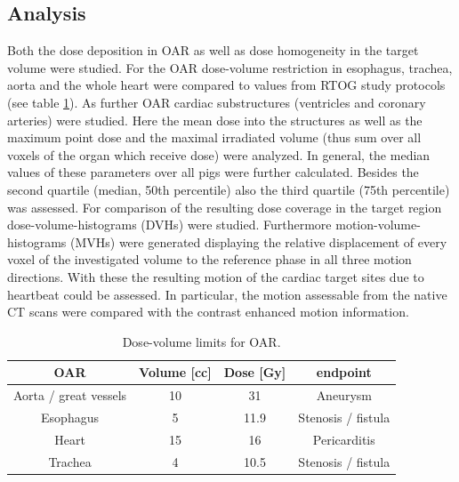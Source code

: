 \documentclass[type=dr, dr=rernat, accentcolor=tud7b,colorbacktitle, bigchapter, openright, twoside, 12pt ]{tudthesis}
\begin{document}
\subsection{Analysis}

Both the dose deposition in OAR as well as dose homogeneity in the target volume were studied. For the OAR dose-volume restriction in 
esophagus, trachea, aorta and the whole heart were compared to values from RTOG study protocols (see table \ref{tab:RTOG:pig}). 
As further OAR cardiac substructures (ventricles and coronary arteries) were studied. Here the mean dose into the structures as well as the 
maximum point dose and the maximal irradiated volume (thus sum over all voxels of the organ which receive dose) were analyzed. In general, the 
median values of these parameters over all pigs were further calculated. Besides the second quartile (median, 50th percentile) also the 
third quartile (75th percentile) was assessed. For comparison of the resulting dose coverage in the target region dose-volume-histograms 
(DVHs) were studied. Furthermore motion-volume-histograms (MVHs) \cite{Ric13} were generated displaying the relative displacement of every 
voxel of the investigated volume to the reference phase in all three motion directions. With these the resulting motion of the cardiac 
target sites due to heartbeat could be assessed. In particular, the motion assessable from the native CT scans were compared with the contrast 
enhanced motion information.  

\begin{table}[H]
  \centering
  \caption{Dose-volume limits for OAR.}
  \begin{tabular}{|c|c|c|c|}
    \hline\hline
    OAR & Volume [cc] & Dose [Gy] & endpoint \\
    \hline
    Aorta / great vessels & 10 & 31 & Aneurysm \\
    Esophagus & 5 & 11.9 &  Stenosis / fistula \\
    Heart & 15 & 16 & Pericarditis \\
    Trachea & 4 & 10.5 & Stenosis / fistula \\
    \hline\hline
  \end{tabular}
  \label{tab:RTOG:pig}
\end{table}
\end{document}
